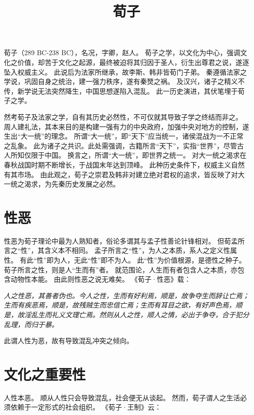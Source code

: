 \documentclass[11pt]{article}
\title{荀子}
\date{}
\begin{document}
  \maketitle

  \linenumbers
  
荀子（289 BC-238 BC），名况，字卿，赵人。
荀子之学，以文化为中心，强调文化之价值，却苦于文化之起源，最终被迫将其归因于圣人，衍生出尊君之说，遂逐坠入权威主义。
此说后为法家所继承，故李斯、韩非皆荀门子弟。
秦遵循法家之学说，巩固自身之统治，建一强力秩序，遂有秦燹之祸。
及汉兴，诸子之精义不传，新学说无法突然降生，中国思想遂陷入混乱。
此一历史演进，其伏笔埋于荀子之学。

\newline

然考荀子及法家之学，自有其历史必然性，不可仅就其导致子学之终结而非之。
周人建礼法，其本来目的是构建一强有力的中央政府，加强中央对地方的控制，遂生出“大一统”的理念。
所谓“大一统”，即“天下”应当统一，诸侯混战为一不正常之乱象。
此为诸子之共识。此处需强调，古籍所言“天下”，实指“世界”，尽管古人所知仅限于中国。
换言之，所谓“大一统”，即世界之统一。
对大一统之渴求在春秋战国时期不断增长，于战国末年达到顶峰。
此种历史条件下，权威主义自然有其市场。
由此观之，荀子之崇君及韩非对建立绝对君权的追求，皆反映了对大一统之渴求，为先秦历史发展之必然。

\section{性恶}
性恶为荀子理论中最为人熟知者，俗论多谓其与孟子性善论针锋相对。
但荀孟所言之“性”，其含义本不相同。
孟子所言之“性”，为人之本质，系人之定义性属性。
有此“性”即为人，无此“性”即不为人。
此“性”为价值根源，是德性之种子。
荀子所言之性，则是人“生而有”者。
就范围论，人生而有者包含人之本质，亦包含动物性本能。
由此则性恶之说无难矣。
《荀子·性恶》载：

\textit{人之性恶，其善者伪也。今人之性，生而有好利焉，顺是，故争夺生而辞让亡焉；生而有疾恶焉，顺是，故残贼生而忠信亡焉；生而有耳目之欲，有好声色焉，顺是，故淫乱生而礼义文理亡焉。然则从人之性，顺人之情，必出于争夺，合于犯分乱理，而归于暴。}

此谓人性为恶，故有导致混乱冲突之倾向。

\section{文化之重要性}
人性本恶。
顺从人性只会导致混乱，社会便无从谈起。
然而，荀子谓人之生活必须依赖于一定形式的社会组织。
《荀子·王制》云：
\end{document}
